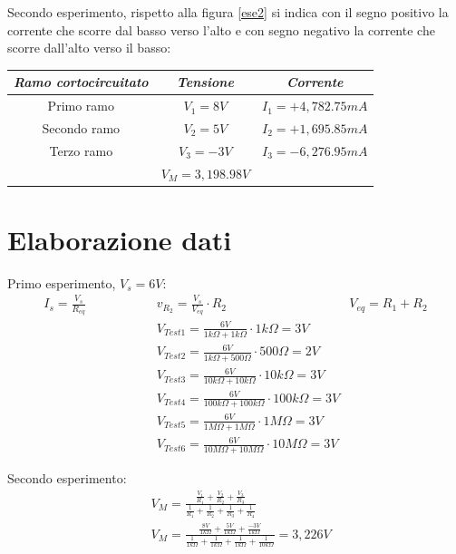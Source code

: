     \begin{center}
        Secondo esperimento, rispetto alla figura \ref{ese2} si indica con il segno positivo la corrente che scorre dal basso verso l'alto e con segno negativo
        la corrente che scorre dall'alto verso il basso: \par
    \begin{tabular}{|c|c|c|}
        \hline
        \textit{Ramo cortocircuitato} & \textit{Tensione} & \textit{Corrente} \\
        \hline
        Primo ramo & $V_1 = 8V$ & $I_1 = +4,782.75 mA$\\
        \hline
        Secondo ramo & $V_2 = 5V$ & $I_2 = +1,695.85 mA$\\
        \hline
        Terzo ramo & $V_3 = -3V$ & $I_3 = -6,276.95 mA$\\
        \hline
        & $V_M = 3,198.98V$&\\
        \hline
    
    \end{tabular}
    \end{center}


    \newpage

    \section{Elaborazione dati}
    Primo esperimento, $V_s = 6V$:
    \begin{align}
        I_s = \frac{V_s}{R_{eq}}  \hspace{2cm}   & v_{R_2} = \frac{V_s}{V_{eq}} \cdot R_2  \hspace{2cm} &  V_{eq} = R_1 + R_2 \\
        & V_{Test1} = \frac{6V}{1k\Omega + 1k\Omega} \cdot 1k\Omega = 3V \\
        & V_{Test2} = \frac{6V}{1k\Omega + 500\Omega} \cdot 500\Omega = 2V \\
        & V_{Test3} = \frac{6V}{10k\Omega + 10k\Omega} \cdot 10k\Omega = 3V \\
        & V_{Test4} = \frac{6V}{100k\Omega + 100k\Omega} \cdot 100k\Omega = 3V \\
        & V_{Test5} = \frac{6V}{1M\Omega + 1M\Omega} \cdot 1M\Omega = 3V \\
        & V_{Test6} = \frac{6V}{10M\Omega + 10M\Omega} \cdot 10M\Omega = 3V
    \end{align}

    Secondo esperimento:
    \begin{align}
       & V_M = \frac{\frac{V_1}{R_1} + \frac{V_2}{R_2} + \frac{V_3}{R_3}}{\frac{1}{R_1} + \frac{1}{R_2} + \frac{1}{R_3} + \frac{1}{R_4}}\\
       & V_M = \frac{\frac{8V}{1k\Omega} + \frac{5V}{1k\Omega} + \frac{-3V}{1k\Omega}}{\frac{1}{1k\Omega} + \frac{1}{1k\Omega} + \frac{1}{1k\Omega} + \frac{1}{10k\Omega}} = 3,226V
    \end{align}
    


